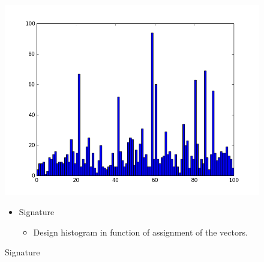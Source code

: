\documentclass[xcolor=table]{beamer}
\begin{document}
\begin{frame}
\begin{figure}[htbp]
    \begin{minipage}[c]{.40\linewidth}
      \begin{center}
    \includegraphics[scale=0.18]{132_sig.png}
    \caption{Signature}
    \label{fig:Sig}
      \end{center}
    \end{minipage}
    \hfill
    \begin{minipage}[c]{.55\linewidth}
      \begin{center}
        \begin{itemize}
            \item Signature
            \begin{itemize}
                \item Design histogram in function of assignment of the vectors.
            \end{itemize}
        \end{itemize}
      \end{center}
    \end{minipage}
\end{figure}


\end{frame}
\end{document}
